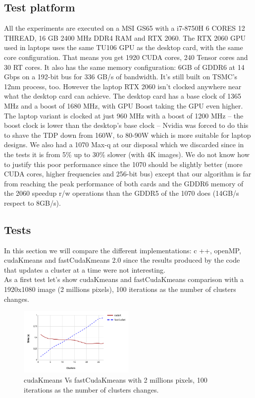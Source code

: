 \documentclass[10pt,twocolumn,letterpaper]{article}
\begin{document}
\subsection{Test platform}

All the experiments are executed on a MSI GS65 with a i7-8750H 6 CORES 12 THREAD, 16 GB 2400 MHz DDR4 RAM and RTX 2060.
The RTX 2060 GPU used in laptops uses the same TU106 GPU as the desktop card, with the same core configuration. That means you get 1920 CUDA cores, 240 Tensor cores and 30 RT cores. It also has the same memory configuration: 6GB of GDDR6 at 14 Gbps on a 192-bit bus for 336 GB/s of bandwidth. It’s still built on TSMC’s 12nm process, too.
However the laptop RTX 2060 isn’t clocked anywhere near what the desktop card can achieve. The desktop card has a base clock of 1365 MHz and a boost of 1680 MHz, with GPU Boost taking the GPU even higher. The laptop variant is clocked at just 960 MHz with a boost of 1200 MHz -- the boost clock is lower than the desktop's base clock -- Nvidia was forced to do this to shave the TDP down from 160W, to 80-90W which is more suitable for laptop designs.
We also had a 1070 Max-q at our disposal which we discarded since in the tests it is from 5\% up to 30\% slower (with 4K images).
We do not know how to justify this poor performance since the 1070  should be slightly better (more CUDA cores, higher frequencies and 256-bit bus) except that our algorithm is far from reaching the peak performance of both cards and the GDDR6 memory of the 2060 speedup r/w operations than the GDDR5 of the 1070 does (14GB/s respect to 8GB/s).

\subsection{Tests}

In this section we will compare the different implementations: c ++, openMP, cudaKmeans and fastCudaKmeans 2.0 since the results produced by the code that updates a cluster at a time were not interesting.\\

As a first test let's show cudaKmeans and fastCudaKmeans comparison with a 1920x1080 image (2 millions pixels), 100 iterations as the number of clusters changes.


\begin{figure}[H]
\begin{center}
\includegraphics[width=0.5\textwidth]{latex/5.png}
\caption{cudaKmeans Vs fastCudaKmeans with 2 millions pixels, 100 iterations as the number of clusters changes.}
\label{etichetta}
\end{center}
\end{figure}
\end{document}

